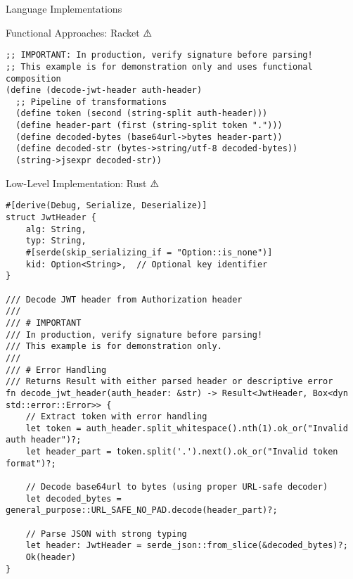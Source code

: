 \documentclass[presentation,aspectratio=169]{beamer}
\begin{document}
\begin{frame}[label={sec:orgcc55a06},fragile]{Language Implementations}
\begin{block}{Functional Approaches: Racket ⚠️}
\begin{verbatim}
;; IMPORTANT: In production, verify signature before parsing!
;; This example is for demonstration only and uses functional composition
(define (decode-jwt-header auth-header)
  ;; Pipeline of transformations
  (define token (second (string-split auth-header)))
  (define header-part (first (string-split token ".")))
  (define decoded-bytes (base64url->bytes header-part))
  (define decoded-str (bytes->string/utf-8 decoded-bytes))
  (string->jsexpr decoded-str))
\end{verbatim}
\end{block}
\begin{block}{Low-Level Implementation: Rust ⚠️}
\begin{verbatim}
#[derive(Debug, Serialize, Deserialize)]
struct JwtHeader {
    alg: String,
    typ: String,
    #[serde(skip_serializing_if = "Option::is_none")]
    kid: Option<String>,  // Optional key identifier
}

/// Decode JWT header from Authorization header
/// 
/// # IMPORTANT
/// In production, verify signature before parsing!
/// This example is for demonstration only.
/// 
/// # Error Handling
/// Returns Result with either parsed header or descriptive error
fn decode_jwt_header(auth_header: &str) -> Result<JwtHeader, Box<dyn std::error::Error>> {
    // Extract token with error handling
    let token = auth_header.split_whitespace().nth(1).ok_or("Invalid auth header")?;
    let header_part = token.split('.').next().ok_or("Invalid token format")?;

    // Decode base64url to bytes (using proper URL-safe decoder)
    let decoded_bytes = general_purpose::URL_SAFE_NO_PAD.decode(header_part)?;

    // Parse JSON with strong typing
    let header: JwtHeader = serde_json::from_slice(&decoded_bytes)?;
    Ok(header)
}
\end{verbatim}
\end{block}
\end{frame}
\end{document}

